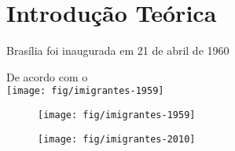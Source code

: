 \chapter{Introdução Teórica}

Brasília foi inaugurada em 21 de abril de 1960

De acordo com o  \\

\texttt{[image: fig/imigrantes-1959]}

\begin{figure}
    \centering
    \texttt{[image: fig/imigrantes-1959]}
    \caption{}
    \label{fig:imigrantes-1959}
\end{figure}

\begin{figure}
    \centering
    \texttt{[image: fig/imigrantes-2010]}
    \caption{}
    \label{fig:imigrantes-2010}
\end{figure}
